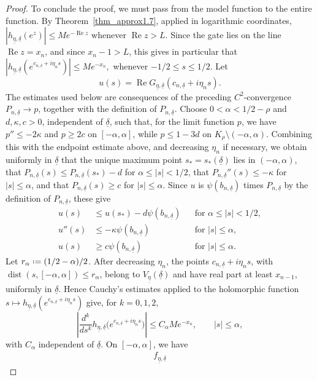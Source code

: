 \documentclass[10pt,a4paper]{amsart}
\newcommand{\Rea}{\operatorname{Re }}
\newcommand*{\defeq}{\mathrel{\vcenter{\baselineskip0.5ex \lineskiplimit0pt
 \hbox{\scriptsize.}\hbox{\scriptsize.}}}=}
\newcommand{\uldelta}{\underline{\delta}}
\newcommand{\uleta}{\underline{\eta}}
\begin{document}
\begin{proof}
	To conclude the proof, we must pass from the model function to the entire
	function. By Theorem~\ref{thm_approx1.7}, applied in logarithmic
	coordinates,
	$
	|h_{\uleta,\uldelta}(e^z)|\le Me^{-\Rea z}
	$
	whenever \(\Rea z>L\). Since the gate lies on the line \(\Rea z=x_n\), and
	since \(x_n-1>L\), this gives in particular
	that $
	|h_{\uleta,\uldelta}(e^{c_{n,\uldelta}+i\eta_ns})|
	\le Me^{-x_n},$ whenever $-1/2\le s\le1/2$. Let
	\[
	u(s)=\Rea G_{\uleta,\uldelta}(c_{n,\uldelta}+i\eta_ns).
	\]
	The estimates used below are consequences of the preceding
		\(C^2\)-convergence \(P_{n,\uldelta}\to p\), together with the definition of
		\(P_{n,\uldelta}\). Choose \(0<\alpha<1/2-\rho\) and
		\(d,\kappa,c>0\), independent of \(\uldelta\), such that, for the limit
		function \(p\), we have \(p''\le -2\kappa\) and \(p\ge 2c\) on
		\([-\alpha,\alpha]\), while \(p\le1-3d\) on
		\(K_\rho\setminus(-\alpha,\alpha)\). Combining this with the endpoint
		estimate above, and decreasing \(\eta_n\) if necessary, we obtain uniformly
		in \(\uldelta\) that the unique maximum point \(s_*=s_*(\uldelta)\) lies in
		\((-\alpha,\alpha)\), that
		\(P_{n,\uldelta}(s)\le P_{n,\uldelta}(s_*)-d\) for
		\(\alpha\le |s|<1/2\), that \(P_{n,\uldelta}''(s)\le-\kappa\) for
		\(|s|\le\alpha\), and that \(P_{n,\uldelta}(s)\ge c\) for
		\(|s|\le\alpha\). Since \(u\) is \(\psi(b_{n,\uldelta})\) times
		\(P_{n,\uldelta}\) by the definition of \(P_{n,\uldelta}\), these give
		\[
			\begin{aligned}
				u(s)&\le u(s_*)-d\psi(b_{n,\uldelta})
				&&\text{for } \alpha\le |s|<1/2,\\
				u''(s)&\le -\kappa\psi(b_{n,\uldelta})
				&&\text{for } |s|\le\alpha,\\
				u(s)&\ge c\psi(b_{n,\uldelta})
				&&\text{for } |s|\le\alpha .
		\end{aligned}
		\]
	Let
	\(r_\alpha\defeq(1/2-\alpha)/2\). After decreasing $\eta_n$, the points $c_{n,\uldelta}+i\eta_ns$, with $\operatorname{dist}(s,[-\alpha,\alpha])\le r_\alpha$, belong to $V_{\uleta}(\uldelta)$ and have real part at least $x_{n-1}$, uniformly in $\uldelta$. Hence Cauchy's estimates applied to the holomorphic function
	\(s\mapsto h_{\uleta,\uldelta}(e^{c_{n,\uldelta}+i\eta_ns})\) give, for
	\(k=0,1,2\),
	\[
	\left|
	\frac{d^k}{ds^k}
	h_{\uleta,\uldelta}
	\bigl(e^{c_{n,\uldelta}+i\eta_ns}\bigr)
	\right|
	\le
	C_\alpha Me^{-x_n},
	\qquad |s|\le\alpha,
	\]
	with \(C_\alpha\) independent of \(\uldelta\). 
	On \([-\alpha,\alpha]\), we have
	\[
	\begin{aligned}
		f_{\uleta,\uldelta}

\end{aligned}\]
\end{proof}
\end{document}

